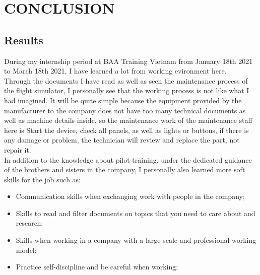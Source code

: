 \chapter{CONCLUSION}

\renewcommand{\headrulewidth}{0.5pt}
\renewcommand{\footrulewidth}{0.5pt}
\thispagestyle{plain}
\pagestyle{fancy}
\fancyhf{}
\raggedright
{}

\section{Results}
    During my internship period at BAA Training Vietnam from January 18th 2021 to March 18th 2021, I have learned 
    a lot from working evironment here. \\
    \vspace{3mm}
    Through the documents I have read as well as seen the maintenance process of the flight simulator, I personally 
    see that the working process is not like what I had imagined. It will be quite simple because the equipment 
    provided by the manufacturer to the company does not have too many technical documents as well as machine details 
    inside, so the maintenance work of the maintenance staff here is Start the device, check all panels, as well as 
    lights or buttons, if there is any damage or problem, the technician will review and replace the part, not repair it. \\ 
    \vspace{3mm}
    In addition to the knowledge about pilot training, under the dedicated guidance of the brothers and sisters in the 
    company, I personally also learned more soft skills for the job such as:
    \begin{itemize}
        \item Communication skills when exchanging work with people in the company;
        \item Skills to read and filter documents on topics that you need to care about and research;
        \item Skills when working in a company with a large-scale and professional working model;
        \item Practice self-discipline and be careful when working;
    \end{itemize}

